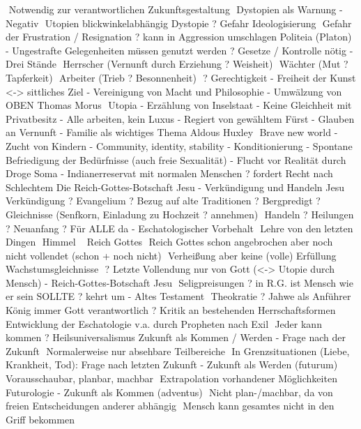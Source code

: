 \documentclass[11pt, paper=a4, twocolumn]{scrartcl}
\begin{document}
	Notwendig zur verantwortlichen Zukunftsgestaltung
	Dystopien als Warnung
-	Negativ
	Utopien blickwinkelabhängig Dystopie
? Gefahr Ideologisierung
	Gefahr der Frustration / Resignation
? kann in Aggression umschlagen
Politeia (Platon)
-	Ungestrafte Gelegenheiten müssen genutzt werden
? Gesetze / Kontrolle nötig
-	Drei Stände
	Herrscher (Vernunft durch Erziehung
? Weisheit)
	Wächter (Mut ? Tapferkeit)
	Arbeiter (Trieb ? Besonnenheit)
	? Gerechtigkeit
-	Freiheit der Kunst <-> sittliches Ziel
-	Vereinigung von Macht und Philosophie
-	Umwälzung von OBEN
Thomas Morus  Utopia
-	Erzählung von Inselstaat
-	Keine Gleichheit mit Privatbesitz
-	Alle arbeiten, kein Luxus
-	Regiert von gewähltem Fürst
-	Glauben an Vernunft
-	Familie als wichtiges Thema
Aldous Huxley  Brave new world
-	Zucht von Kindern
-	Community, identity, stability
-	Konditionierung
-	Spontane Befriedigung der Bedürfnisse (auch freie Sexualität)
-	Flucht vor Realität durch Droge Soma
-	Indianerreservat mit normalen Menschen
? fordert Recht nach Schlechtem
Die Reich-Gottes-Botschaft Jesu
-	Verkündigung und Handeln Jesu
	Verkündigung
?	Evangelium
?	Bezug auf alte Traditionen
?	Bergpredigt
?	Gleichnisse (Senfkorn, Einladung zu Hochzeit ? annehmen)
	Handeln
?	Heilungen ? Neuanfang
?	Für ALLE da
-	Eschatologischer Vorbehalt
	Lehre von den letzten Dingen
	Himmel ~ Reich Gottes
	Reich Gottes schon angebrochen aber noch nicht vollendet (schon + noch nicht)
	Verheißung aber keine (volle) Erfüllung
	Wachstumsgleichnisse
	? Letzte Vollendung nur von Gott
(<-> Utopie durch Mensch)
-	Reich-Gottes-Botschaft Jesu
	Seligpreisungen
? in R.G. ist Mensch wie er sein SOLLTE
? kehrt um
-	Altes Testament
	Theokratie ? Jahwe als Anführer
	König immer Gott verantwortlich
? Kritik an bestehenden Herrschaftsformen
	Entwicklung der Eschatologie v.a. durch Propheten nach Exil
	Jeder kann kommen ? Heilsuniversalismus
Zukunft als Kommen / Werden
-	Frage nach der Zukunft
	Normalerweise nur absehbare Teilbereiche
	In Grenzsituationen (Liebe, Krankheit, Tod):
Frage nach letzten Zukunft
-	Zukunft als Werden (futurum)
	Vorausschaubar, planbar, machbar
	Extrapolation vorhandener Möglichkeiten
	Futurologie
-	Zukunft als Kommen (adventus)
	Nicht plan-/machbar, da von freien Entscheidungen anderer abhängig
	Mensch kann gesamtes nicht in den Griff bekommen
\end{document}
